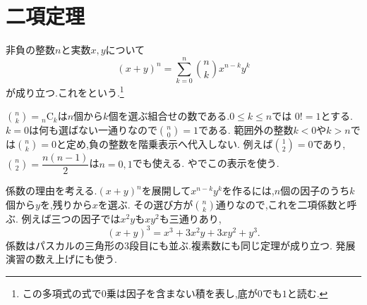 
\section{二項定理}\label{節：二項定理}
  非負の整数$n$と実数$x,y$について
    \[
      (x+y)^n=\sum_{k=0}^n\binom nk x^{n-k}y^k
    \]
  が成り立つ.これをという.\footnote{この多項式の式で0乗は因子を含まない積を表し,底が$0$でも$1$と読む.}

  $\binom nk={}_n\mathrm C_k$は$n$個から$k$個を選ぶ組合せの数である.$0\le k\le n$では
\BookMathLayout{\[
  \binom nk=\frac{n!}{k!(n-k)!}
    =\frac{n(n-1)\cdots(n-k+1)}{k!}
\]}{\[
\begin{aligned}
\binom nk&=\frac{n!}{k!(n-k)!}\\
&=\frac{n(n-1)\cdots(n-k+1)}{k!}.
\end{aligned}
\]}
  $0!=1$とする.$k=0$は何も選ばない一通りなので$\binom n0=1$である.
  範囲外の整数$k<0$や$k>n$では$\binom nk=0$と定め,負の整数を階乗表示へ代入しない.
  例えば$\binom12=0$であり,$\binom n2=\dfrac{n(n-1)}{2}$は$n=0,1$でも使える.
  やでこの表示を使う.

  係数の理由を考える.$(x+y)^n$を展開して$x^{n-k}y^k$を作るには,$n$個の因子のうち$k$個から$y$を,残りから$x$を選ぶ.
  その選び方が$\binom nk$通りなので,これを二項係数と呼ぶ.
  例えば三つの因子では$x^2y$も$xy^2$も三通りあり,
  \[
    (x+y)^3=x^3+3x^2y+3xy^2+y^3.
  \]
  係数はパスカルの三角形の3段目にも並ぶ.複素数にも同じ定理が成り立つ.
  発展演習の数え上げにも使う.

